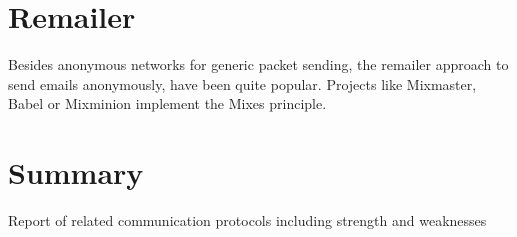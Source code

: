 \section{Remailer}
Besides anonymous networks for generic packet sending, the remailer approach
to send emails anonymously, have been quite popular.
Projects like Mixmaster\cite{mixmaster}, 
Babel\cite{babel} or Mixminion\cite{mixminion} implement
the Mixes principle\cite{Chaum:1981:UEM:358549.358563}.
\section{Summary}
Report of related communication protocols including strength and weaknesses
